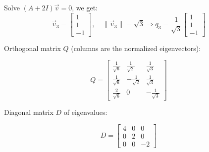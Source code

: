 \documentclass[12pt]{article}
\begin{document}
\begin{enumerate}[leftmargin=0em]
    Solve \( (A + 2I)\vec{v} = 0 \), we get:
    \[
    \vec{v}_3 = \begin{bmatrix} 1 \\ 1 \\ -1 \end{bmatrix}, \quad
    \|\vec{v}_3\| = \sqrt{3}
    \Rightarrow
    q_3 = \frac{1}{\sqrt{3}} \begin{bmatrix} 1 \\ 1 \\ -1 \end{bmatrix}
    \]
    
    Orthogonal matrix \( Q \) (columns are the normalized eigenvectors):
    
    \[
    Q =
    \begin{bmatrix}
    \frac{1}{\sqrt{6}} & \frac{1}{\sqrt{2}} & \frac{1}{\sqrt{3}} \\
    \frac{1}{\sqrt{6}} & -\frac{1}{\sqrt{2}} & \frac{1}{\sqrt{3}} \\
    \frac{2}{\sqrt{6}} & 0 & -\frac{1}{\sqrt{3}}
    \end{bmatrix}
    \]
    
    Diagonal matrix \( D \) of eigenvalues:
    
    \[
    D = \begin{bmatrix}
    4 & 0 & 0 \\
    0 & 2 & 0 \\
    0 & 0 & -2
    \end{bmatrix}
    \]
    
\end{enumerate}
\end{document}
